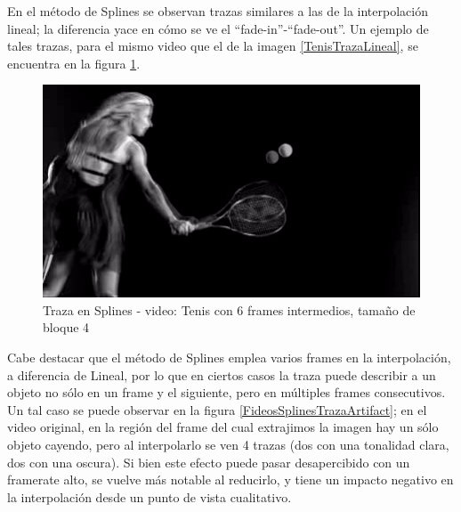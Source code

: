 \par En el m\'etodo de Splines se observan trazas similares a las de la interpolaci\'on lineal; la diferencia yace en c\'omo se ve el ``fade-in''-``fade-out''.
Un ejemplo de tales trazas, para el mismo video que el de la imagen \ref{TenisTrazaLineal}, se encuentra en la figura \ref{TenisTrazaSplines}.

\FloatBarrier
\begin{figure}[h]
\caption{Traza en Splines - video: Tenis con 6 frames intermedios, tama\~no de bloque 4}
\label{TenisTrazaSplines}
\includegraphics[width=0.9\columnwidth]{imagenes/cualitativos/TTS.png}
\end{figure}
\FloatBarrier

\par Cabe destacar que el m\'etodo de Splines emplea varios frames en la interpolaci\'on, a diferencia de Lineal, por lo que en ciertos casos la traza puede describir a un objeto no s\'olo en un frame y el siguiente, pero en m\'ultiples frames consecutivos.
Un tal caso se puede observar en la figura \ref{FideosSplinesTrazaArtifact}; en el video original, en la regi\'on del frame del cual extrajimos la imagen hay un s\'olo objeto cayendo, pero al interpolarlo se ven 4 trazas (dos con una tonalidad clara, dos con una oscura).
Si bien este efecto puede pasar desapercibido con un framerate alto, se vuelve m\'as notable al reducirlo, y tiene un impacto negativo en la interpolaci\'on desde un punto de vista cualitativo.

